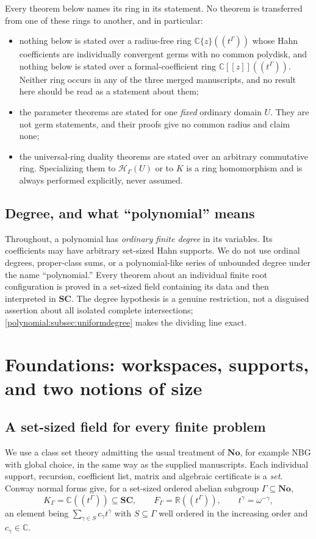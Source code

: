 \documentclass[11pt,letterpaper]{article}
\numberwithin{equation}{section}
\theoremstyle{definition}
\theoremstyle{remark}\newtheorem{remark}[theorem]{Remark}
\newcommand{\No}{\mathbf{No}}
\newcommand{\SC}{\mathbf{SC}}
\newcommand{\C}{\mathbb C}
\newcommand{\R}{\mathbb R}
\newcommand{\HH}{\mathscr H_\Gamma}
\begin{document}
\noindent
Every theorem below names its ring in its statement. No theorem is
transferred from one of these rings to another, and in particular:

\begin{itemize}
\item nothing below is stated over a radius-free ring $\C\{z\}((t^\Gamma))$
whose Hahn coefficients are individually convergent germs with no common
polydisk, and nothing below is stated over a formal-coefficient ring
$\C[[z]]((t^\Gamma))$. Neither ring occurs in any of the three merged
manuscripts, and no result here should be read as a statement about them;
\item the parameter theorems are stated for one \emph{fixed} ordinary domain
$U$. They are not germ statements, and their proofs give no common radius and
claim none;
\item the universal-ring duality theorems are stated over an arbitrary
commutative ring. Specializing them to $\HH(U)$ or to $K$ is a ring
homomorphism and is always performed explicitly, never assumed.
\end{itemize}

\subsection{Degree, and what ``polynomial'' means}
Throughout, a polynomial has \emph{ordinary finite degree} in its variables.
Its coefficients may have arbitrary set-sized Hahn supports. We do not use
ordinal degrees, proper-class sums, or a polynomial-like series of unbounded
degree under the name ``polynomial.'' Every theorem about an individual
finite root configuration is proved in a set-sized field containing its data
and then interpreted in $\SC$. The degree hypothesis is a genuine
restriction, not a disguised assertion about all isolated complete
intersections; \cref{polynomial:subsec:uniformdegree} makes the dividing line
exact.

\section{Foundations: workspaces, supports, and two notions of size}
\label{polynomial:sec:foundations}

\subsection{A set-sized field for every finite problem}
We use a class set theory admitting the usual treatment of $\No$, for example
NBG with global choice, in the same way as the supplied manuscripts. Each
individual support, recursion, coefficient list, matrix and algebraic
certificate is a \emph{set}. Conway normal forms give, for a set-sized ordered
abelian subgroup $\Gamma\subseteq\No$,
\begin{equation}\label{polynomial:eq:workspace}
 K_\Gamma=\C((t^\Gamma))\subseteq\SC,\qquad
 F_\Gamma=\R((t^\Gamma)),\qquad t^\gamma=\omega^{-\gamma},
\end{equation}
an element being $\sum_{\gamma\in S}c_\gamma t^\gamma$ with $S\subseteq\Gamma$
well ordered in the increasing order and $c_\gamma\in\C$.
\end{document}
